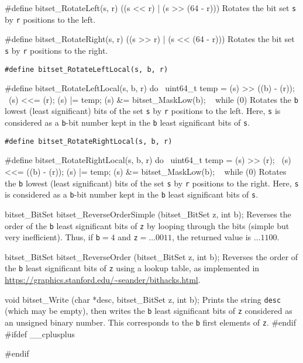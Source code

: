 {#define bitset_RotateLeft(s, r)  ((s << r) | (s >> (64 - r)))
\endcode
 \tab  Rotates the bit set {\tt s} by {\tt r} positions to the left.
 \endtab
\code

#define bitset_RotateRight(s, r)  ((s >> r) | (s << (64 - r)))
\endcode
 \tab  Rotates the bit set {\tt s} by {\tt r} positions to the right.
\endtab

\noindent
{\tt\#define bitset\_RotateLeftLocal(s, b, r)}

\hide\code
#define bitset_RotateLeftLocal(s, b, r) do { \
   uint64_t temp = (s) >> ((b) - (r)); \
   (s) <<= (r);   (s) |= temp;   (s) &= bitset_MaskLow(b); \
   } while (0)
\endcode\endhide
\tab  Rotates the {\tt b} lowest (least significant) bits of
  the set {\tt s} by {\tt r} positions to the left.
  Here, {\tt s} is considered as a {\tt b}-bit number kept
  in the {\tt b} least significant bits of {\tt s}.
 \endtab

\noindent
{\tt\#define bitset\_RotateRightLocal(s, b, r)}

\hide\code
#define bitset_RotateRightLocal(s, b, r) do { \
   uint64_t temp = (s) >> (r); \
   (s) <<= ((b) - (r));   (s) |= temp;   (s) &= bitset_MaskLow(b); \
   } while (0)
\endcode\endhide
 \tab  Rotates the {\tt b} lowest (least significant) bits of
  the set {\tt s} by {\tt r} positions to the right.
  Here, {\tt s} is considered as a {\tt b}-bit number kept
  in the {\tt b} least significant bits of {\tt s}.
 \endtab


\guisec{Prototypes}
\code

bitset_BitSet bitset_ReverseOrderSimple (bitset_BitSet z, int b);
\endcode
\tab Reverses the order of the {\tt b} least significant bits of {\tt z} by looping
    through the bits (simple but very inefficient). Thus, if {\tt b}${}=4$ and
    {\tt z}${} = \dots 0011$, the returned value is $\dots 1100$.
 \endtab
\code

bitset_BitSet bitset_ReverseOrder (bitset_BitSet z, int b);
\endcode
\tab Reverses the order of the {\tt b} least significant bits of {\tt z} using
    a lookup table, as implemented in \url{https://graphics.stanford.edu/~seander/bithacks.html}.
\endtab
\code

void bitset_Write (char *desc, bitset_BitSet z, int b);
\endcode
  \tab
  Prints the string {\tt desc} (which may be empty), then writes the {\tt b}
	least significant bits of {\tt z} considered as an unsigned binary number.
  This corresponds to the {\tt b} first elements of {\tt z}.
 \endtab
\code\hide
#endif
#ifdef __cplusplus
}
#endif
\endhide\endcode
